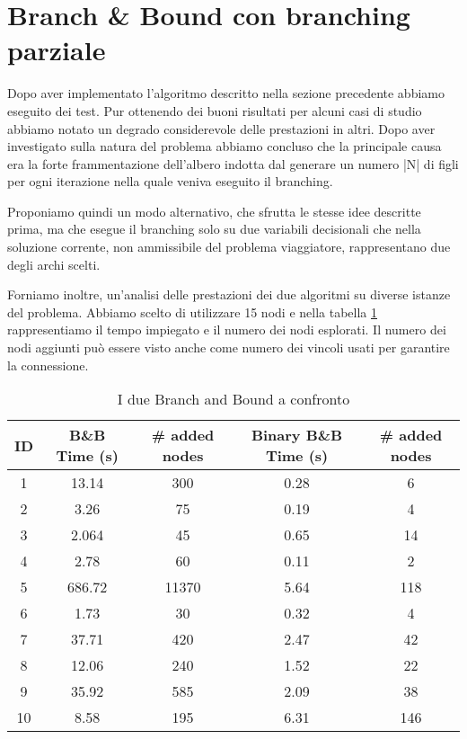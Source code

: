 \section{Branch \& Bound con branching parziale}
Dopo aver implementato l’algoritmo descritto nella sezione precedente abbiamo eseguito dei test. Pur ottenendo dei buoni risultati per alcuni casi di studio abbiamo notato un degrado considerevole delle prestazioni in altri. Dopo aver investigato sulla natura del problema abbiamo concluso che la principale causa era la forte frammentazione dell’albero indotta dal generare un numero |N| di figli per ogni iterazione nella quale veniva eseguito il branching. 

Proponiamo quindi un modo alternativo, che sfrutta le stesse idee descritte prima, ma che esegue il branching solo su due variabili decisionali che nella soluzione corrente, non ammissibile del problema viaggiatore, rappresentano due degli archi scelti.

Forniamo inoltre, un'analisi delle prestazioni dei due algoritmi su diverse istanze del problema. Abbiamo scelto di utilizzare 15 nodi e nella tabella \ref{tab:bb_performance} rappresentiamo il tempo impiegato e il numero dei nodi esplorati. Il numero dei nodi aggiunti può essere visto anche come numero dei vincoli usati per garantire la connessione.

\begin{table}[htbp]
    \centering
    \begin{tabular}{|c|c|c|c|c|}
        \hline
        \textbf{ID} & \textbf{B\&B Time (s)} & 
        \textbf{\# added nodes} & 
        \textbf{Binary B\&B Time (s)} & 
        \textbf{\# added nodes} \\
        \hline
        1 & 13.14 & 300  & 0.28 & 6 \\
        \hline
        2 & 3.26 & 75 & 0.19 & 4 \\
        \hline
        3 & 2.064 & 45 & 0.65 & 14\\
        \hline
        4 & 2.78 & 60 & 0.11 & 2\\
        \hline
        5 & 686.72 & 11370 & 5.64 & 118 \\
        \hline
        6 & 1.73 & 30 & 0.32 & 4 \\
        \hline
        7 & 37.71 & 420 & 2.47 & 42 \\
        \hline
        8 & 12.06 & 240 & 1.52 & 22 \\
        \hline
        9 & 35.92 & 585 & 2.09 & 38 \\
        \hline
        10 & 8.58 & 195 & 6.31 & 146 \\
        \hline
    \end{tabular}
    \caption{I due Branch and Bound a confronto}\label{tab:bb_performance}
\end{table}


